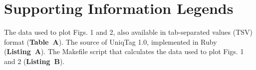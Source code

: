 \documentclass[10pt]{article}
\begin{document}
\section{Supporting Information
Legends}\label{supporting-information-legends}

\begin{description}
\itemsep1pt\parskip0pt
\item[S1 File.]
The data used to plot Figs. 1 and 2, also available in tab-separated
values (TSV) format (\textbf{Table~A}). The source of UniqTag 1.0,
implemented in Ruby (\textbf{Listing~A}). The Makefile script that
calculates the data used to plot Figs. 1 and 2 (\textbf{Listing~B}).
\end{description}
\end{document}
